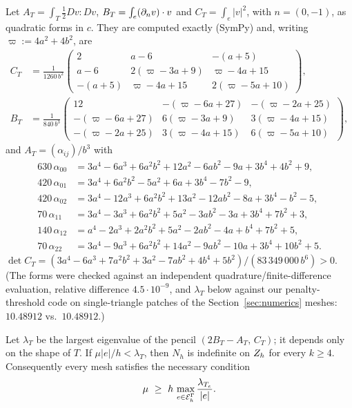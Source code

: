 Let $A_T=\int_T\frac12Dv:Dv$, $B_T=\int_e(\partial_n v)\cdot v$ and $C_T=\int_e|v|^2$, with $n=(0,-1)$, as quadratic forms in $c$. They are
computed exactly (SymPy) and, writing $\varpi:=4a^2+4b^2$, are
\begin{align*}
C_T&=\frac1{1260\,b^2}\begin{pmatrix}2&a-6&-(a+5)\\ a-6&2(\varpi-3a+9)&\varpi-4a+15\\ -(a+5)&\varpi-4a+15&2(\varpi-5a+10)\end{pmatrix},\\
B_T&=\frac1{840\,b^3}\begin{pmatrix}12&-(\varpi-6a+27)&-(\varpi-2a+25)\\ -(\varpi-6a+27)&6(\varpi-3a+9)&3(\varpi-4a+15)\\ -(\varpi-2a+25)&3(\varpi-4a+15)&6(\varpi-5a+10)\end{pmatrix},
\end{align*}
and $A_T=(\alpha_{ij})/b^3$ with
\begin{align*}
630\,\alpha_{00}&=3a^4-6a^3+6a^2b^2+12a^2-6ab^2-9a+3b^4+4b^2+9,\\
420\,\alpha_{01}&=3a^4+6a^2b^2-5a^2+6a+3b^4-7b^2-9,\\
420\,\alpha_{02}&=3a^4-12a^3+6a^2b^2+13a^2-12ab^2-8a+3b^4-b^2-5,\\
70\,\alpha_{11}&=3a^4-3a^3+6a^2b^2+5a^2-3ab^2-3a+3b^4+7b^2+3,\\
140\,\alpha_{12}&=a^4-2a^3+2a^2b^2+5a^2-2ab^2-4a+b^4+7b^2+5,\\
70\,\alpha_{22}&=3a^4-9a^3+6a^2b^2+14a^2-9ab^2-10a+3b^4+10b^2+5 .
\end{align*}
$\det C_T=(3a^4-6a^3+7a^2b^2+3a^2-7ab^2+4b^4+5b^2)/(83\,349\,000\,b^6)>0$. (The forms were checked against an independent
quadrature/finite-difference evaluation, relative difference $4.5\cdot10^{-9}$, and $\lambda_T$ below against our
penalty-threshold code on single-triangle patches of the Section~\ref{sec:numerics} meshes: $10.48912$ vs.\ $10.48912$.)

\begin{theorem}\label{pb:thm}
Let $\lambda_T$ be the largest eigenvalue of the pencil $(2B_T-A_T,\,C_T)$; it depends only on the shape of $T$. If
$\mu|e|/h<\lambda_T$, then $N_h$ is indefinite on $Z_h$ for every $k\ge4$. Consequently every mesh satisfies the necessary
condition
\[
\mu\ \ge\ h\,\max_{e\in\EG}\frac{\lambda_{T_e}}{|e|} .
\]
\end{theorem}

